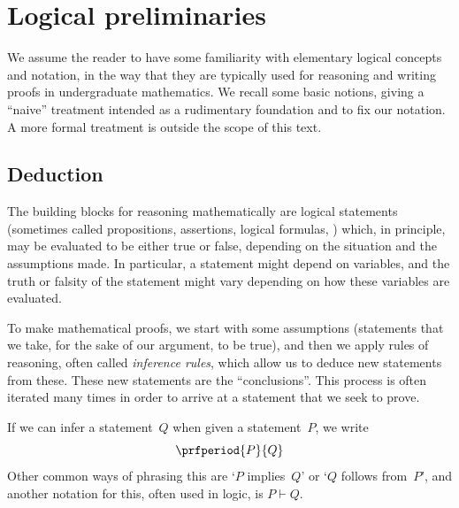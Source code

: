 
\section{Logical preliminaries}
\label{sec:logical-prelim}


We assume the reader to have some familiarity with elementary logical concepts and notation, in the way that they are typically used for reasoning and writing proofs in undergraduate mathematics.
We recall some basic notions, giving a ``naive'' treatment intended as a rudimentary foundation and to fix our notation.
A more formal treatment is outside the scope of this text.


\subsection{Deduction}

The building blocks for reasoning mathematically are logical statements (sometimes called propositions, assertions, logical formulas, \etc) which, in principle, may be evaluated to be either true or false, depending on the situation and the assumptions made.
In particular, a statement might depend on variables, and the truth or falsity of the statement might vary depending on how these variables are evaluated.

To make mathematical proofs, we start with some assumptions (statements that we take, for the sake of our argument, to be true), and then we apply rules of reasoning, often called \emph{inference rules}, which allow us to deduce new statements from these.
These new statements are the ``conclusions''.
This process is often iterated many times in order to arrive at a statement that we seek to prove.

If we can infer a statement~$Q$ when given a statement~$P$, we write
\begin{equation}
    \prfperiod
    {P}{Q}
\end{equation}
Other common ways of phrasing this are `$P$ implies~$Q$' or `$Q$ follows from~$P$', and another notation for this, often used in logic, is $P \vdash Q$.

